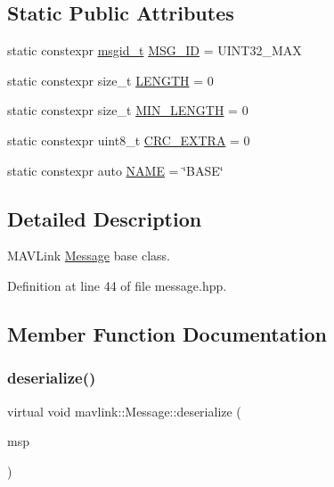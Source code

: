 \subsection*{Static Public Attributes}
\begin{DoxyCompactItemize}
\item 
static constexpr \mbox{\hyperlink{namespacemavlink_a98a1fe49b380ed1ea252d2c13bf3278d}{msgid\+\_\+t}} \mbox{\hyperlink{structmavlink_1_1Message_a7f0f3c243218c213c80b88967607630e}{M\+S\+G\+\_\+\+ID}} = U\+I\+N\+T32\+\_\+\+M\+AX
\item 
static constexpr size\+\_\+t \mbox{\hyperlink{structmavlink_1_1Message_a5bf17835d1732e0b83212a853a838c6b}{L\+E\+N\+G\+TH}} = 0
\item 
static constexpr size\+\_\+t \mbox{\hyperlink{structmavlink_1_1Message_ae5e5cad97fc4b3e648c0a05f504d8770}{M\+I\+N\+\_\+\+L\+E\+N\+G\+TH}} = 0
\item 
static constexpr uint8\+\_\+t \mbox{\hyperlink{structmavlink_1_1Message_ad261058b3a7dc68e69cd631e5cd766a2}{C\+R\+C\+\_\+\+E\+X\+T\+RA}} = 0
\item 
static constexpr auto \mbox{\hyperlink{structmavlink_1_1Message_a8c65d1ee019780792fa21e2502b5306b}{N\+A\+ME}} = \char`\"{}B\+A\+SE\char`\"{}
\end{DoxyCompactItemize}


\subsection{Detailed Description}
M\+A\+V\+Link \mbox{\hyperlink{structmavlink_1_1Message}{Message}} base class. 

Definition at line 44 of file message.\+hpp.



\subsection{Member Function Documentation}
\mbox{\label{structmavlink_1_1Message_a082824377e57f4e90bce4cba1a44f90b}} 
\subsubsection{\texorpdfstring{deserialize()}{deserialize()}}
{\footnotesize\ttfamily virtual void mavlink\+::\+Message\+::deserialize (\begin{DoxyParamCaption}\item[{\mbox{\hyperlink{classmavlink_1_1MsgMap}{Msg\+Map}} \&}]{msp }\end{DoxyParamCaption})\hspace{0.3cm}{\ttfamily [pure virtual]}}


